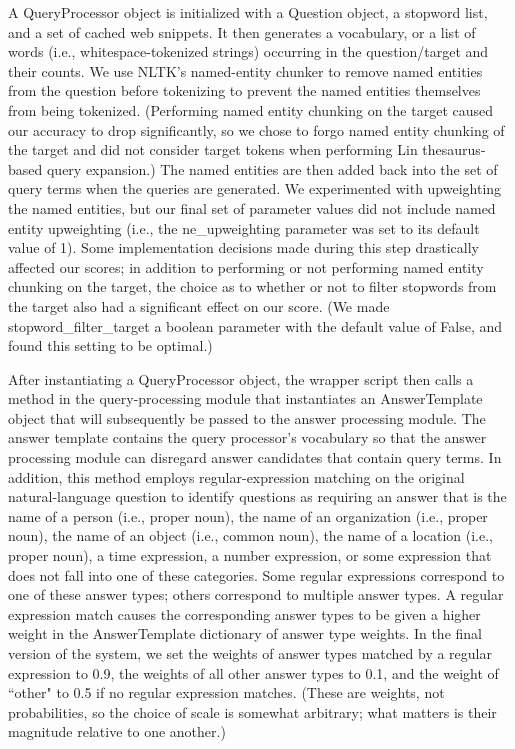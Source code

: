 \documentclass[11pt]{article}
\begin{document}
A QueryProcessor object is initialized with a Question object, a stopword list, and a set of cached web snippets. It then generates a vocabulary, or a list of words (i.e., whitespace-tokenized strings) occurring in the question/target and their counts. We use NLTK's named-entity chunker to remove named entities from the question before tokenizing to prevent the named entities themselves from being tokenized. (Performing named entity chunking on the target caused our accuracy to drop significantly, so we chose to forgo named entity chunking of the target and did not consider target tokens when performing Lin thesaurus-based query expansion.) The named entities are then added back into the set of query terms when the queries are generated. We experimented with upweighting the named entities, but our final set of parameter values did not include named entity upweighting (i.e., the ne\_upweighting parameter was set to its default value of 1). Some implementation decisions made during this step drastically affected our scores; in addition to performing or not performing named entity chunking on the target, the choice as to whether or not to filter stopwords from the target also had a significant effect on our score. (We made stopword\_filter\_target a boolean parameter with the default value of False, and found this setting to be optimal.)

After instantiating a QueryProcessor object, the wrapper script then calls a method in the query-processing module that instantiates an AnswerTemplate object that will subsequently be passed to the answer processing module. The answer template contains the query processor's vocabulary so that the answer processing module can disregard answer candidates that contain query terms. In addition, this method employs regular-expression matching on the original natural-language question to identify questions as requiring an answer that is the name of a person (i.e., proper noun), the name of an organization (i.e., proper noun), the name of an object (i.e., common noun), the name of a location (i.e., proper noun), a time expression, a number expression, or some expression that does not fall into one of these categories. Some regular expressions correspond to one of these answer types; others correspond to multiple answer types. A regular expression match causes the corresponding answer types to be given a higher weight in the AnswerTemplate dictionary of answer type weights. In the final version of the system, we set the weights of answer types matched by a regular expression to 0.9, the weights of all other answer types to 0.1, and the weight of ``other" to 0.5 if no regular expression matches. (These are weights, not probabilities, so the choice of scale is somewhat arbitrary; what matters is their magnitude relative to one another.)
\end{document}
